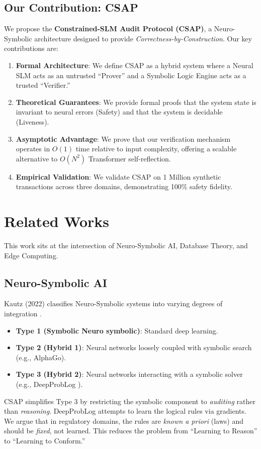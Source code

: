 \documentclass[11pt]{article}
\begin{document}
\subsection{Our Contribution: CSAP}
We propose the \textbf{Constrained-SLM Audit Protocol (CSAP)}, a Neuro-Symbolic architecture designed to provide \textit{Correctness-by-Construction}. Our key contributions are:
\begin{enumerate}
    \item \textbf{Formal Architecture}: We define CSAP as a hybrid system where a Neural SLM acts as an untrusted ``Prover'' and a Symbolic Logic Engine acts as a trusted ``Verifier.''
    \item \textbf{Theoretical Guarantees}: We provide formal proofs that the system state is invariant to neural errors (Safety) and that the system is decidable (Liveness).
    \item \textbf{Asymptotic Advantage}: We prove that our verification mechanism operates in $O(1)$ time relative to input complexity, offering a scalable alternative to $O(N^2)$ Transformer self-reflection.
    \item \textbf{Empirical Validation}: We validate CSAP on 1 Million synthetic transactions across three domains, demonstrating 100\% safety fidelity.
\end{enumerate}

\section{Related Works}

This work sits at the intersection of Neuro-Symbolic AI, Database Theory, and Edge Computing.

\subsection{Neuro-Symbolic AI}
Kautz (2022) classifies Neuro-Symbolic systems into varying degrees of integration \cite{kautz2022}.
\begin{itemize}
    \item \textbf{Type 1 (Symbolic Neuro symbolic)}: Standard deep learning.
    \item \textbf{Type 2 (Hybrid 1)}: Neural networks loosely coupled with symbolic search (e.g., AlphaGo).
    \item \textbf{Type 3 (Hybrid 2)}: Neural networks interacting with a symbolic solver (e.g., DeepProbLog \cite{manhaeve2018}).
\end{itemize}
CSAP simplifies Type 3 by restricting the symbolic component to \textit{auditing} rather than \textit{reasoning}. DeepProbLog attempts to learn the logical rules via gradients. We argue that in regulatory domains, the rules are \textit{known a priori} (laws) and should be \textit{fixed}, not learned. This reduces the problem from ``Learning to Reason'' to ``Learning to Conform.''
\end{document}
